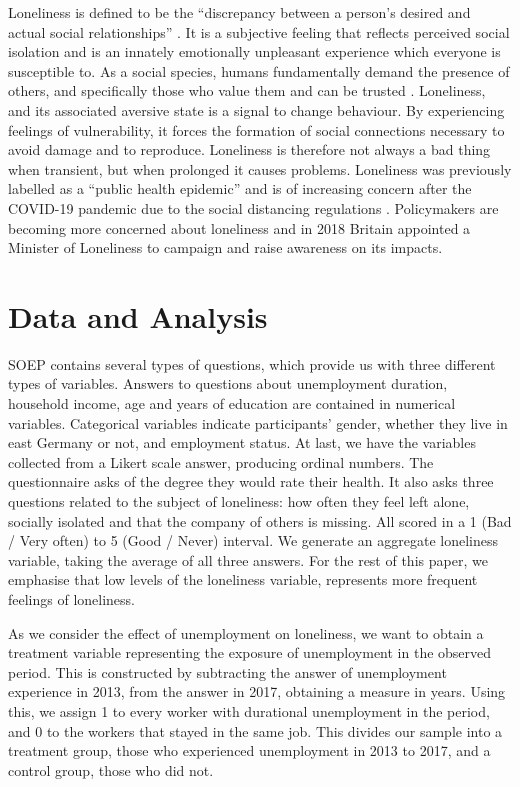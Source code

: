 \documentclass[11pt, a4paper, leqno]{article}
\begin{document}
Loneliness is defined to be the “discrepancy between a person's desired and actual social relationships” \cite{masi2011meta}.
It is a subjective feeling that reflects perceived social isolation and is an innately emotionally unpleasant experience which everyone is susceptible to. As a social species, humans fundamentally demand the presence of others,
and specifically those who value them and can be trusted \cite{cacioppo2008loneliness}. Loneliness, and its associated aversive state is a signal to change behaviour.
By experiencing feelings of vulnerability, it forces the formation of social connections necessary to avoid damage and to reproduce.
Loneliness is therefore not always a bad thing when transient, but when prolonged it causes problems. Loneliness was previously labelled as a “public health epidemic”
and is of increasing concern after the COVID-19 pandemic due to the social distancing regulations . Policymakers are becoming more concerned about loneliness and in 2018 Britain
appointed a Minister of Loneliness to campaign and raise awareness on its impacts.

\section{Data and Analysis} %
\label{sec: Data and Analysis}

SOEP contains several types of questions, which provide us with three different types of variables. Answers to questions about unemployment duration, household income, age and years of education are contained in
numerical variables. Categorical variables indicate participants' gender, whether they live in east Germany or not, and employment status. At last, we have the variables collected from a Likert scale answer, producing ordinal numbers.
The questionnaire asks of the degree they would rate their health. It also asks three questions related to the subject of loneliness: how often they feel left alone, socially isolated and that the company of others is missing. All scored in a 1
(Bad / Very often) to 5 (Good / Never) interval. We generate an aggregate loneliness variable, taking the average of all three answers. For the rest of this paper, we emphasise that low levels of the loneliness variable, represents more frequent feelings of loneliness.

As we consider the effect of unemployment on loneliness, we want to obtain a treatment variable representing the exposure of unemployment in the observed period. This is constructed by subtracting the answer of unemployment experience in 2013, from the answer in 2017,
obtaining a measure in years. Using this, we assign 1 to every worker with durational unemployment in the period, and 0 to the workers that stayed in the same job. This divides our sample into a treatment group, those who experienced unemployment in 2013 to 2017, and a control group,
those who did not.
\end{document}
